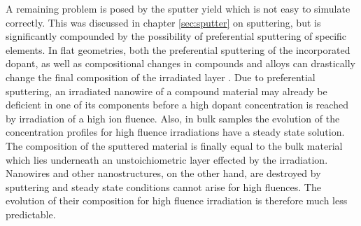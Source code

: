A remaining problem is posed by the sputter yield which is not easy to simulate correctly. This was discussed in chapter \ref{sec:sputter} on sputtering, but is significantly compounded by the possibility of preferential sputtering of specific elements. In flat geometries, both the preferential sputtering of the incorporated dopant, as well as compositional changes in compounds and alloys can drastically change the final composition of the irradiated layer \cite{moller_tridyn_1984,andersen_computer_1986,moller_tridyn-binary_1988,sigmund_alloy_1993,zaporozchenko_preferential_1995}. Due to preferential sputtering, an irradiated nanowire of a compound material may already be deficient in one of its components before a high dopant concentration is reached by irradiation of a high ion fluence. Also, in bulk samples the evolution of the concentration profiles for high fluence irradiations have a steady state solution. The composition of the sputtered material is finally equal to the bulk material which lies underneath an unstoichiometric layer effected by the irradiation. Nanowires and other nanostructures, on the other hand, are destroyed by sputtering and steady state conditions cannot arise for high fluences. The evolution of their composition for high fluence irradiation is therefore much less predictable.
